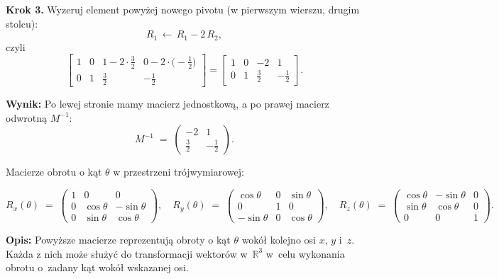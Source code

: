\noindent
\textbf{Krok 3.} Wyzeruj element powyżej nowego pivotu (w pierwszym wierszu, drugim \mbox{stolcu}):
\[
R_1 \,\leftarrow\, R_1 - 2\,R_2,
\]
czyli
\[
\left[
\begin{array}{cc|cc}
1 & 0 & 1 - 2\cdot\tfrac32 & 0 - 2\cdot\bigl(-\tfrac12\bigr) \\
0 & 1 & \tfrac32 & -\tfrac12
\end{array}
\right]
=
\left[
\begin{array}{cc|cc}
1 & 0 & -2 & 1 \\
0 & 1 & \tfrac32 & -\tfrac12
\end{array}
\right].
\]

\noindent
\textbf{Wynik:} Po lewej stronie mamy macierz jednostkową, a po prawej macierz odwrotną $M^{-1}$:
\[
M^{-1} 
\;=\;
\begin{pmatrix}
-2 & 1 \\
\tfrac{3}{2} & -\tfrac{1}{2}
\end{pmatrix}.
\]





\vspace{1em}
\noindent
Macierze obrotu o kąt \(\theta\) w przestrzeni trójwymiarowej:

\[
R_x(\theta) \;=\;
\begin{pmatrix}
1 & 0 & 0 \\
0 & \cos\theta & -\sin\theta \\
0 & \sin\theta & \cos\theta
\end{pmatrix},
\quad
R_y(\theta) \;=\;
\begin{pmatrix}
\cos\theta & 0 & \sin\theta \\
0 & 1 & 0 \\
-\sin\theta & 0 & \cos\theta
\end{pmatrix},
\quad
R_z(\theta) \;=\;
\begin{pmatrix}
\cos\theta & -\sin\theta & 0 \\
\sin\theta & \cos\theta & 0 \\
0 & 0 & 1
\end{pmatrix}.
\]

\noindent
\textbf{Opis:} Powyższe macierze reprezentują obroty o kąt \(\theta\) wokół kolejno osi \(x\), \(y\) i~\(z\). Każda z nich może służyć do transformacji wektorów w~\(\mathbb{R}^3\) w~celu wykonania obrotu o~zadany kąt wokół wskazanej osi.







